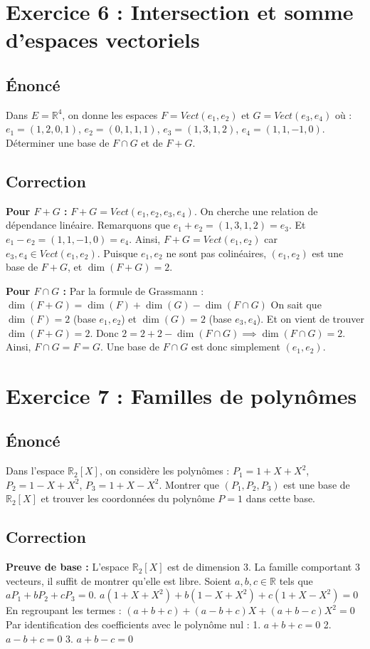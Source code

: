 \documentclass{report}
\begin{document}
\newpage


\chapter*{Exercice 6 : Intersection et somme d'espaces vectoriels}

\section*{Énoncé}
Dans $E = \mathbb{R}^4$, on donne les espaces $F = Vect(e_1, e_2)$ et $G = Vect(e_3, e_4)$ où :
$e_1 = (1, 2, 0, 1)$, $e_2 = (0, 1, 1, 1)$, $e_3 = (1, 3, 1, 2)$, $e_4 = (1, 1, -1, 0)$.
Déterminer une base de $F \cap G$ et de $F + G$.

\section*{Correction}
\textbf{Pour $F+G$ :}
$F+G = Vect(e_1, e_2, e_3, e_4)$.
On cherche une relation de dépendance linéaire.
Remarquons que $e_1 + e_2 = (1, 3, 1, 2) = e_3$.
Et $e_1 - e_2 = (1, 1, -1, 0) = e_4$.
Ainsi, $F+G = Vect(e_1, e_2)$ car $e_3, e_4 \in Vect(e_1, e_2)$.
Puisque $e_1, e_2$ ne sont pas colinéaires, $(e_1, e_2)$ est une base de $F+G$, et $\dim(F+G) = 2$.

\textbf{Pour $F \cap G$ :}
Par la formule de Grassmann :
$\dim(F+G) = \dim(F) + \dim(G) - \dim(F \cap G)$
On sait que $\dim(F) = 2$ (base $e_1, e_2$) et $\dim(G) = 2$ (base $e_3, e_4$).
Et on vient de trouver $\dim(F+G) = 2$.
Donc $2 = 2 + 2 - \dim(F \cap G) \implies \dim(F \cap G) = 2$.
Ainsi, $F \cap G = F = G$. Une base de $F \cap G$ est donc simplement $(e_1, e_2)$.

\newpage


\chapter*{Exercice 7 : Familles de polynômes}

\section*{Énoncé}
Dans l'espace $\mathbb{R}_2[X]$, on considère les polynômes :
$P_1 = 1 + X + X^2$, $P_2 = 1 - X + X^2$, $P_3 = 1 + X - X^2$.
Montrer que $(P_1, P_2, P_3)$ est une base de $\mathbb{R}_2[X]$ et trouver les coordonnées du polynôme $P = 1$ dans cette base.

\section*{Correction}
\textbf{Preuve de base :}
L'espace $\mathbb{R}_2[X]$ est de dimension 3. La famille comportant 3 vecteurs, il suffit de montrer qu'elle est libre.
Soient $a, b, c \in \mathbb{R}$ tels que $aP_1 + bP_2 + cP_3 = 0$.
$a(1+X+X^2) + b(1-X+X^2) + c(1+X-X^2) = 0$
En regroupant les termes :
$(a+b+c) + (a-b+c)X + (a+b-c)X^2 = 0$
Par identification des coefficients avec le polynôme nul :
1. $a+b+c = 0$
2. $a-b+c = 0$
3. $a+b-c = 0$
\end{document}
